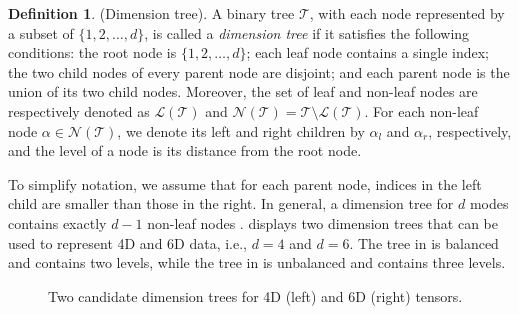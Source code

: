 \documentclass{article}
\theoremstyle{plain}
\theoremstyle{definition}
\newtheorem{definition}[theorem]{Definition}
\theoremstyle{remark}
\begin{document}
\begin{definition}
(Dimension tree). A binary tree $\mathcal{T}$, with each node represented by a subset of $\{1,2,\ldots,d\}$, is called a \textit{dimension tree} if it satisfies the following conditions: the root node is $\{1,2,\ldots,d\}$; each leaf node contains a single index; the two child nodes of every parent node are disjoint; and each parent node is the union of its two child nodes. Moreover, the set of leaf and non-leaf nodes are respectively denoted as $\mathcal{L}(\mathcal{T})$ and $\mathcal{N}(\mathcal{T}) = \mathcal{T} \setminus \mathcal{L}(\mathcal{T})$. For each non-leaf node $\alpha \in \mathcal{N}(\mathcal{T})$, we denote its left and right children by $\alpha_l$ and $\alpha_r$, respectively, and the level of a node is its distance from the root node. 
\end{definition}

To simplify notation, we assume that for each parent node, indices in the left child are smaller than those in the right. In general, a dimension tree for \(d\) modes contains exactly \(d-1\) non-leaf nodes \cite{grasedyck2010hierarchical_SIMAA}.  displays two dimension trees that can be used to represent 4D and 6D data, i.e., \(d=4\) and \(d=6\). The tree in  is balanced and contains two levels, while the tree in  is unbalanced and contains three levels.

\begin{figure}[t]
    \centering
    \caption{Two candidate dimension trees for 4D (left) and 6D (right) tensors.}
    \label{fig:dimension_trees}
\end{figure}
\end{document}
